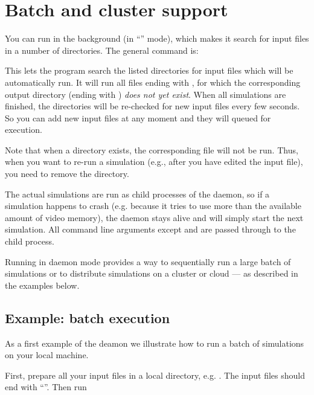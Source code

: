 \section{Batch and cluster support}\label{daemon}


You can run \prog in the background (in ``'' mode), which makes it search for input files in a number of directories. The general command is:


This lets the program search the listed directories for input files which will be automatically run. It will run all files ending with , for which the corresponding output directory (ending with ) \emph{does not yet exist}.  When all simulations are finished, the directories will be re-checked for new input files every few seconds. So you can add new input files at any moment and they will queued for execution.

Note that when a directory  exists, the corresponding  file will not be run. Thus, when you want to re-run a simulation (e.g., after you have edited the input file), you need to remove the 
 directory.

The actual simulations are run as child processes of the \prog daemon, so if a simulation happens to crash (e.g. because it tries to use more than the available amount of video memory), the daemon stays alive and will simply start the next simulation. All command line arguments except  and  are passed through to the child process.

Running in daemon mode provides a way to sequentially run a large batch of simulations or to distribute simulations on a cluster or cloud --- as described in the examples below.

\subsection{Example: batch execution}

As a first example of the \mumax deamon we illustrate how to run a batch of simulations on your local machine.

First, prepare all your input files in a local directory, e.g. . The input files should end with ``''. Then run


